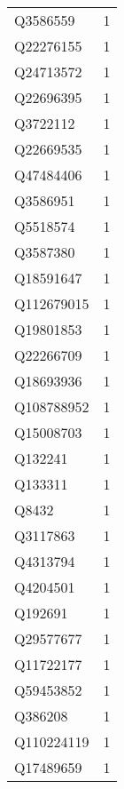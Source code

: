 \begin{tabular}{lr}
    Q3586559 &                             1 \\
   Q22276155 &                             1 \\
   Q24713572 &                             1 \\
   Q22696395 &                             1 \\
    Q3722112 &                             1 \\
   Q22669535 &                             1 \\
   Q47484406 &                             1 \\
    Q3586951 &                             1 \\
    Q5518574 &                             1 \\
    Q3587380 &                             1 \\
   Q18591647 &                             1 \\
  Q112679015 &                             1 \\
   Q19801853 &                             1 \\
   Q22266709 &                             1 \\
   Q18693936 &                             1 \\
  Q108788952 &                             1 \\
   Q15008703 &                             1 \\
     Q132241 &                             1 \\
     Q133311 &                             1 \\
       Q8432 &                             1 \\
    Q3117863 &                             1 \\
    Q4313794 &                             1 \\
    Q4204501 &                             1 \\
     Q192691 &                             1 \\
   Q29577677 &                             1 \\
   Q11722177 &                             1 \\
   Q59453852 &                             1 \\
     Q386208 &                             1 \\
  Q110224119 &                             1 \\
   Q17489659 &                             1 \\

\end{tabular}
